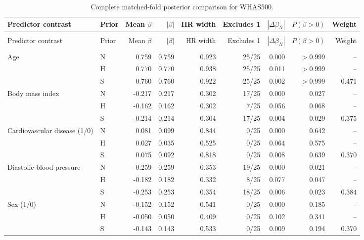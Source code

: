 \begingroup\singlespacing\footnotesize
\setlength{\tabcolsep}{3pt}
\setlength{\LTcapwidth}{\textwidth}
\begin{longtable}{@{}>{\raggedright\arraybackslash}p{}lrrrrrrr@{}}
\caption{Complete matched-fold posterior comparison for WHAS500.}\label{tab:posterior-all-whas500}\\
\toprule
Predictor contrast & Prior & Mean $\beta$ & $|\beta|$ & HR width & Excludes 1 & $|\Delta\beta_N|$ & $P(\beta>0)$ & Weight\\
\midrule\endfirsthead
\multicolumn{9}{l}{\tablename\ \thetable\ (continued)}\\
\toprule
Predictor contrast & Prior & Mean $\beta$ & $|\beta|$ & HR width & Excludes 1 & $|\Delta\beta_N|$ & $P(\beta>0)$ & Weight\\
\midrule\endhead
\midrule
\multicolumn{9}{r}{Continued on next page}\\\endfoot
\bottomrule\endlastfoot
Age & N & 0.759 & 0.759 & 0.923 & 25/25 & 0.000 & $>0.999$ & --\\*
 & H & 0.770 & 0.770 & 0.938 & 25/25 & 0.011 & $>0.999$ & --\\*
 & S & 0.760 & 0.760 & 0.922 & 25/25 & 0.002 & $>0.999$ & 0.471\\[2pt]
Body mass index & N & -0.217 & 0.217 & 0.302 & 17/25 & 0.000 & 0.027 & --\\*
 & H & -0.162 & 0.162 & 0.302 & 7/25 & 0.056 & 0.068 & --\\*
 & S & -0.214 & 0.214 & 0.304 & 17/25 & 0.004 & 0.029 & 0.375\\[2pt]
Cardiovascular disease (1/0) & N & 0.081 & 0.099 & 0.844 & 0/25 & 0.000 & 0.642 & --\\*
 & H & 0.027 & 0.035 & 0.525 & 0/25 & 0.064 & 0.575 & --\\*
 & S & 0.075 & 0.092 & 0.818 & 0/25 & 0.008 & 0.639 & 0.370\\[2pt]
Diastolic blood pressure & N & -0.259 & 0.259 & 0.353 & 19/25 & 0.000 & 0.021 & --\\*
 & H & -0.182 & 0.182 & 0.332 & 8/25 & 0.077 & 0.047 & --\\*
 & S & -0.253 & 0.253 & 0.354 & 18/25 & 0.006 & 0.023 & 0.384\\[2pt]
Sex (1/0) & N & -0.152 & 0.152 & 0.541 & 0/25 & 0.000 & 0.185 & --\\*
 & H & -0.050 & 0.050 & 0.409 & 0/25 & 0.102 & 0.341 & --\\*
 & S & -0.143 & 0.143 & 0.533 & 0/25 & 0.009 & 0.194 & 0.370\\[2pt]

\end{longtable}
